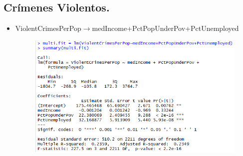 \documentclass[a4paper,10pt,twocolumn]{article}
\begin{document}
\subsection*{Crímenes Violentos.}
\begin{itemize}
	\item {ViolentCrimesPerPop$\rightarrow$medIncome+PctPopUnderPov+PctUnemployed}






		\begin{figure}[H]
			\begin{center}
				\includegraphics[width=.92\columnwidth,right]{figures/multifit1.png}
			\end{center}
		\end{figure}


\end{itemize}
\end{document}
